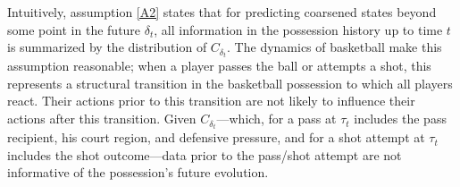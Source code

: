 \documentclass[EPV_JASA.tex]{subfiles}
\begin{document}
Intuitively, assumption \ref{A2} states that for predicting coarsened states beyond some point in the future $\delta_t$, all information in the possession history up to time $t$ is summarized by the distribution of $C_{\delta_t}$. The dynamics of basketball make this assumption reasonable; when a player passes the ball or attempts a shot, this represents a structural transition in the basketball possession to which all players react. Their actions prior to this transition are not likely to influence their actions after this transition. Given $C_{\delta_t}$---which, for a pass at $\tau_t$ includes the pass recipient, his court region, and defensive pressure, and for a shot attempt at $\tau_t$ includes the shot outcome---data prior to the pass/shot attempt are not informative of the possession's future evolution.

\end{document}
